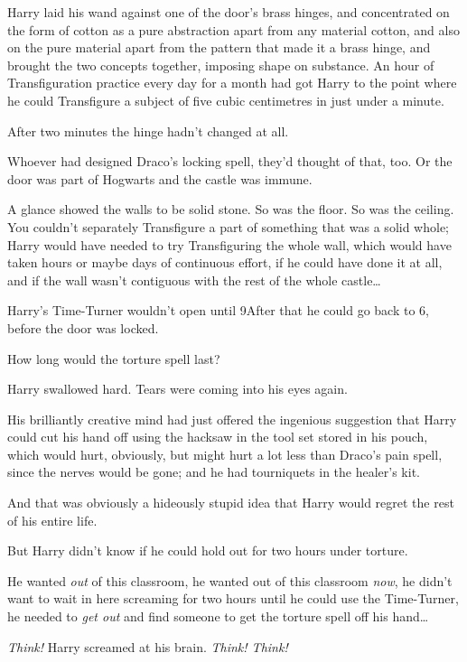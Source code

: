 Harry laid his wand against one of the door’s brass hinges, and concentrated on the form of cotton as a pure abstraction apart from any material cotton, and also on the pure material apart from the pattern that made it a brass hinge, and brought the two concepts together, imposing shape on substance. An hour of Transfiguration practice every day for a month had got Harry to the point where he could Transfigure a subject of five cubic centimetres in just under a minute.

After two minutes the hinge hadn’t changed at all.

Whoever had designed Draco’s locking spell, they’d thought of that, too. Or the door was part of Hogwarts and the castle was immune.

A glance showed the walls to be solid stone. So was the floor. So was the ceiling. You couldn’t separately Transfigure a part of something that was a solid whole; Harry would have needed to try Transfiguring the whole wall, which would have taken hours or maybe days of continuous effort, if he could have done it at all, and if the wall wasn’t contiguous with the rest of the whole castle…

Harry’s Time-Turner wouldn’t open until 9\pm After that he could go back to 6\pm, before the door was locked.

How long would the torture spell last?

Harry swallowed hard. Tears were coming into his eyes again.

His brilliantly creative mind had just offered the ingenious suggestion that Harry could cut his hand off using the hacksaw in the tool set stored in his pouch, which would hurt, obviously, but might hurt a lot less than Draco’s pain spell, since the nerves would be gone; and he had tourniquets in the healer’s kit.

And that was obviously a hideously stupid idea that Harry would regret the rest of his entire life.

But Harry didn’t know if he could hold out for two hours under torture.

He wanted \emph{out} of this classroom, he wanted out of this classroom \emph{now}, he didn’t want to wait in here screaming for two hours until he could use the Time-Turner, he needed to \emph{get out} and find someone to get the torture spell off his hand…

\emph{Think!} Harry screamed at his brain. \emph{Think! Think!}

\later

